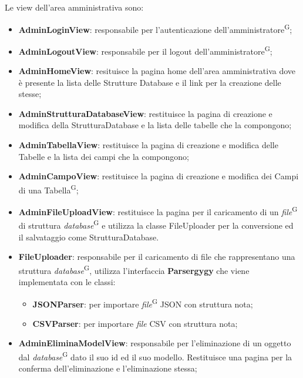 \documentclass[5pt]{article}
\begin{document}
	
	Le view dell'area amministrativa sono:
	\begin{itemize}
		\item \textbf{AdminLoginView}: responsabile per l'autenticazione dell'amministratore\textsuperscript{G};
		\item \textbf{AdminLogoutView}: responsabile per il logout dell'amministratore\textsuperscript{G};
		\item \textbf{AdminHomeView}: resituisce la pagina home dell'area amministrativa dove è presente la lista delle Strutture Database e il link per la creazione delle stesse;
		\item \textbf{AdminStrutturaDatabaseView}: restituisce la pagina di creazione e modifica della StrutturaDatabase e la lista delle tabelle che la compongono;
		\item \textbf{AdminTabellaView}: restituisce la pagina di creazione e modifica delle Tabelle e la lista dei campi che la compongono;
		\item \textbf{AdminCampoView}: restituisce la pagina di creazione e modifica dei Campi di una Tabella\textsuperscript{G};
		\item \textbf{AdminFileUploadView}: restituisce la pagina per il caricamento di un \textit{file}\textsuperscript{G} di struttura \textit{database}\textsuperscript{G} e utilizza la classe FileUploader per la conversione ed il salvataggio come StrutturaDatabase.
		\item \textbf{FileUploader}: responsabile per il caricamento di file che rappresentano una struttura \textit{database}\textsuperscript{G}, utilizza l'interfaccia \textbf{Parsergygy}  che viene implementata con le classi:
		\begin{itemize}
			\item \textbf{JSONParser}: per importare \textit{file}\textsuperscript{G} JSON con struttura nota;
			\item \textbf{CSVParser}: per importare \textit{file} CSV con struttura nota;
		\end{itemize}
		\item \textbf{AdminEliminaModelView}: responsabile per l'eliminazione di un oggetto dal \textit{database}\textsuperscript{G} dato il suo id ed il suo modello. Restituisce una pagina per la conferma dell'eliminazione e l'eliminazione stessa;
	\end{itemize}
	
\end{document}
